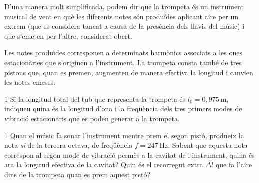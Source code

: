 D'una manera molt simplificada, podem dir que la trompeta és un instrument musical de vent en què les diferents notes són produïdes aplicant aire per un extrem (que es considera tancat a causa de la presència dels llavis del músic) i que s'emeten per l'altre, considerat obert.

Les notes produïdes corresponen a determinats harmònics associats a les ones estacionàries que s'originen a l'instrument. La trompeta consta també de tres pistons que, quan es premen, augmenten de manera efectiva la longitud i canvien les notes emeses.

\begin{apartat}{1}
Si la longitud total del tub que representa la trompeta és $l_0 = 0,975\ \mathrm{m}$, indiqueu quina és la longitud d'ona i la freqüència dels tres primers modes de vibració estacionaris que es poden generar a la trompeta.
\end{apartat}

\begin{apartat}{1}
Quan el músic fa sonar l'instrument mentre prem el segon pistó, produeix la nota \textit{si} de la tercera octava, de freqüència $f = 247\ \mathrm{Hz}$. Sabent que aquesta nota correspon al segon mode de vibració permès a la cavitat de l'instrument, quina és ara la longitud efectiva de la cavitat? Quin és el recorregut extra $\Delta l$ que fa l'aire dins de la trompeta quan es prem aquest pistó?
\end{apartat}

